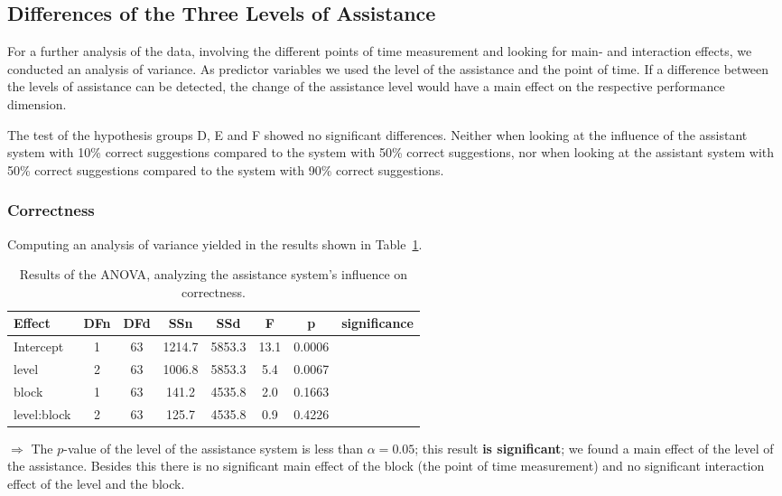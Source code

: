 \subsection{Differences of the Three Levels of Assistance}
	\label{sec:resultsHypDF}
	For a further analysis of the data, involving the different points of time measurement and looking for main- and interaction effects, we conducted an analysis of variance. As predictor variables we used the level of the assistance and the point of time. If a difference between the levels of assistance can be detected, the change of the assistance level would have a main effect on the respective performance dimension.

	The test of the hypothesis groups D, E and F showed no significant differences. Neither when looking at the influence of the assistant system with 10\% correct suggestions compared to the system with 50\% correct suggestions, nor when looking at the assistant system with 50\% correct suggestions compared to the system with 90\% correct suggestions.

	\subsubsection{Correctness}
		Computing an analysis of variance yielded in the results shown in Table~\ref{tab:anovaCorrectness}.

		\begin{table}[H]\centering
			\caption{Results of the \ac{ANOVA}, analyzing the assistance system's influence on correctness.}
			\begin{tabular}{lccccccc}
				\toprule
				Effect & DFn & DFd & SSn & SSd & F & p & significance \\
				\midrule
				Intercept 	& 1 & 63 & 1214.7 & 5853.3 & 13.1 & 0.0006 & \Checkmark \\
				level				& 2 & 63 & 1006.8 & 5853.3 & 5.4  & 0.0067 & \Checkmark  \\
				block 			& 1 & 63 & 141.2  & 4535.8 & 2.0  & 0.1663 & \XSolidBrush \\
				level:block & 2 & 63 & 125.7 & 4535.8 & 0.9 	& 0.4226 & \XSolidBrush \\
				\bottomrule
			\end{tabular}
			\label{tab:anovaCorrectness}
		\end{table}
		\(\Rightarrow\) The \(p\)-value of the level of the assistance system is less than \(\alpha = 0.05\); this result \textbf{is significant}; we found a main effect of the level of the assistance. Besides this there is no significant main effect of the block (the point of time measurement) and no significant interaction effect of the level and the block.

